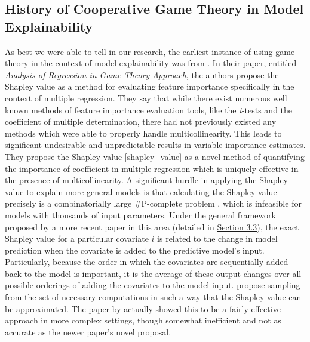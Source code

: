 \subsection{History of Cooperative Game Theory in Model Explainability}
\label{sec:history}

As best we were able to tell in our research, the earliest instance of using game theory in the context of model explainability was from \citet{regressionInGameTheory_MS4}. In their paper, entitled \textit{Analysis of Regression in Game Theory Approach}, the authors propose the Shapley value as a method for evaluating feature importance specifically in the context of multiple regression. They say that while there exist numerous well known methods of feature importance evaluation tools, like the \textit{t}-tests and the coefficient of multiple determination, there had not previously existed any methods which were able to properly handle multicollinearity. This leads to significant undesirable and unpredictable results in variable importance estimates. They propose the Shapley value \eqref{shapley_value} as a novel method of quantifying the importance of coefficient in multiple regression which is uniquely effective in the presence of multicollinearity. A significant hurdle in applying the Shapley value to explain more general models is that calculating the Shapley value precisely is a combinatorially large \#P-complete problem \citep{shapley_complexity}, which is infeasible for models with thousands of input parameters. Under the general framework proposed by a more recent paper in this area \citep{microsoftPaper} (detailed in \hyperref[sec:lundberg]{Section 3.3}), the exact Shapley value for a particular covariate $i$ is related to the change in model prediction when the covariate is added to the predictive model's input. Particularly, because the order in which the covariates are sequentially added back to the model is important, it is the average of these output changes over all possible orderings of adding the covariates to the model input. \citet{regressionInGameTheory_MS4} propose sampling from the set of necessary computations in such a way that the Shapley value can be approximated. The paper by \citet{microsoftPaper} actually showed this to be a fairly effective approach in more complex settings, though somewhat inefficient and not as accurate as the newer paper's novel proposal.


